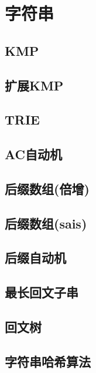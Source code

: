 \chapter{字符串}
\section{KMP}
\raggedbottom
\hrulefill
\section{扩展KMP}
\raggedbottom
\hrulefill
\section{TRIE}
\raggedbottom
\hrulefill
\section{AC自动机}
\raggedbottom
\hrulefill
\section{后缀数组(倍增)}
\raggedbottom
\hrulefill
\section{后缀数组(sais)}
\raggedbottom
\hrulefill
\section{后缀自动机}
\raggedbottom
\hrulefill
\section{最长回文子串}
\raggedbottom
\hrulefill
\section{回文树}
\raggedbottom
\hrulefill
\section{字符串哈希算法}
\raggedbottom
\hrulefill
